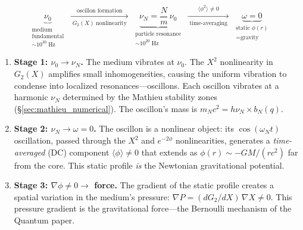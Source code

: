 \documentclass[11pt]{article}
\begin{document}
\begin{equation}
  \boxed{
  \underbrace{\nu_0}_{\substack{\text{medium}\\\text{fundamental}\\
  \sim 10^{30}\;\mathrm{Hz}}}
  \;\xrightarrow[\;G_2(X)\;\text{nonlinearity}\;]
  {\text{oscillon formation}}\;
  \underbrace{\nu_N = \frac{N}{m}\,\nu_0}_{\substack{
  \text{particle resonance}\\
  \sim 10^{20}\;\mathrm{Hz}}}
  \;\xrightarrow[\;\text{time-averaging}\;]
  {\langle\phi^2\rangle \neq 0}\;
  \underbrace{\omega = 0}_{\substack{
  \text{static }\phi(r)\\
  = \text{gravity}}}
  }
  \label{eq:cascade}
\end{equation}

\begin{enumerate}
  \item \textbf{Stage 1: $\nu_0 \to \nu_N$.}
    The medium vibrates at $\nu_0$.
    The $X^2$ nonlinearity in $G_2(X)$ amplifies
    small inhomogeneities, causing the uniform
    vibration to condense into localized
    resonances---oscillons. Each oscillon vibrates
    at a harmonic $\nu_N$ determined by the Mathieu
    stability zones (\S\ref{sec:mathieu_numerical}).
    The oscillon's mass is
    $m_N c^2 = h\nu_N \times b_N(q)$.

  \item \textbf{Stage 2: $\nu_N \to \omega = 0$.}
    The oscillon is a nonlinear object: its
    $\cos(\omega_N t)$ oscillation, passed through
    the $X^2$ and $e^{-2\phi}$ nonlinearities,
    generates a \emph{time-averaged} (DC) component
    $\langle\phi\rangle \neq 0$ that extends as
    $\phi(r) \sim -GM/(rc^2)$ far from the core.
    This static profile \emph{is} the Newtonian
    gravitational potential.

  \item \textbf{Stage 3: $\nabla\phi \neq 0
    \to$ force.}
    The gradient of the static profile creates
    a spatial variation in the medium's pressure:
    $\nabla P = (dG_2/dX)\,\nabla X \neq 0$.
    This pressure gradient is the gravitational
    force---the Bernoulli mechanism of the
    Quantum paper.
\end{enumerate}
\end{document}
